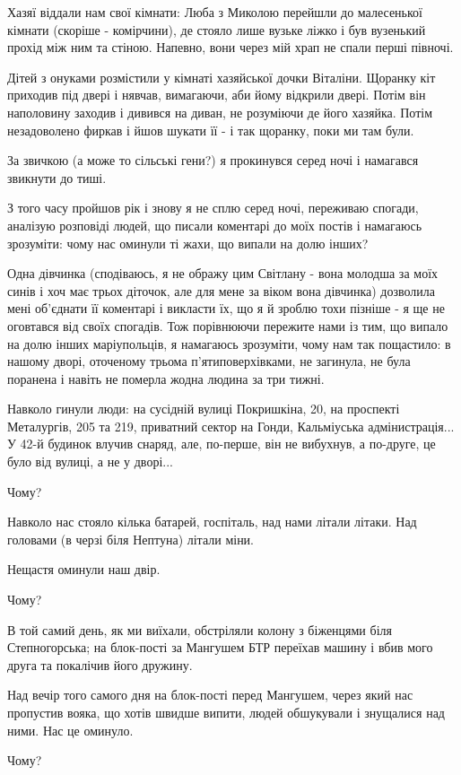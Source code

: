 Хазяї віддали нам свої кімнати: Люба з Миколою перейшли до малесенької кімнати
(скоріше - комірчини), де стояло лише вузьке ліжко і був вузенький прохід між
ним та стіною. Напевно, вони через мій храп не спали перші півночі.

Дітей з онуками розмістили у кімнаті хазяйської дочки Віталіни. Щоранку кіт
приходив під двері і нявчав, вимагаючи, аби йому відкрили двері. Потім він
наполовину заходив і дивився на диван, не розуміючи де його хазяйка. Потім
незадоволено фиркав і йшов шукати її - і так щоранку, поки ми там були. 

За звичкою (а може то сільські гени?) я прокинувся серед ночі і намагався
звикнути до тиші. 

З того часу пройшов рік і знову я не сплю серед ночі, переживаю спогади,
аналізую розповіді людей, що писали коментарі до моїх постів і намагаюсь
зрозуміти: чому нас оминули ті жахи, що випали на долю інших?

Одна дівчинка (сподіваюсь, я не ображу цим Світлану - вона молодша за моїх
синів і хоч має трьох діточок, але для мене за віком вона дівчинка) дозволила
мені об'єднати її коментарі і викласти їх, що я й зроблю тохи пізніше - я ще не
оговтався від своїх спогадів. Тож порівнюючи пережите нами із тим, що випало на
долю інших маріупольців, я намагаюсь зрозуміти, чому нам так пощастило: в
нашому дворі, оточеному трьома п'ятиповерхівками, не загинула, не була поранена
і навіть не померла жодна людина за три тижні.

Навколо гинули люди: на сусідній вулиці Покришкіна, 20, на проспекті
Металургів, 205 та 219, приватний сектор на Гонди, Кальміуська адмінистрація...
У 42-й будинок влучив снаряд, але, по-перше, він не вибухнув, а по-друге, це
було від вулиці, а не у дворі...

Чому? 

Навколо нас стояло кілька батарей, госпіталь, над нами літали літаки. Над
головами (в черзі біля Нептуна) літали міни.

Нещастя оминули наш двір.

Чому?

В той самий день, як ми виїхали, обстріляли колону з біженцями біля
Степногорська; на блок-пості за Мангушем БТР переїхав машину і вбив мого друга
та покалічив його дружину. 

Над вечір того самого дня на блок-пості перед Мангушем, через який нас
пропустив вояка, що хотів швидше випити, людей обшукували і знущалися над ними.
Нас це оминуло.

Чому?

